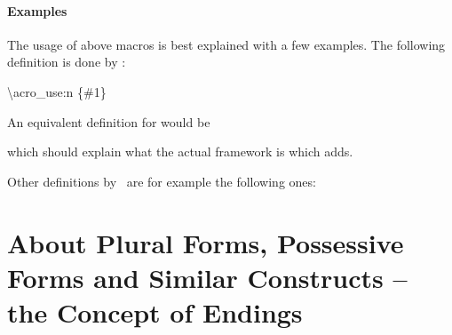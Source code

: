 \documentclass[load-preamble+]{cnltx-doc}
\begin{document}
\paragraph{Examples}
The usage of above macros is best explained with a few examples.  The
following definition is done by \acro:
\begin{sourcecode}
  \NewAcroCommand \ac { \acro_use:n {#1} }
\end{sourcecode}
An equivalent definition for  would be
which should explain what the actual framework is which 
adds.

Other definitions by \acro\ are for example the following ones:

\section{About Plural Forms, Possessive Forms and Similar Constructs -- the
  Concept of Endings}
\end{document}
